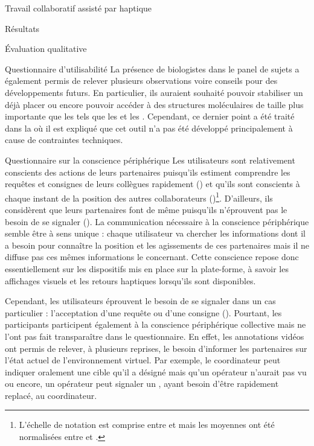 \documentclass[myfrancais,ngerman,english,frenchb]{mythesis}
\begin{document}
\begin{mychapter}{Travail collaboratif assisté par haptique}
\begin{mysection}{Résultats}
\begin{mysubsection}{Évaluation qualitative}
\begin{mysubsubsection}{Questionnaire d'utilisabilité}
					La présence de biologistes dans le panel de sujets a également permis de relever plusieurs observations voire conseils pour des développements futurs.
					En particulier, ils auraient souhaité pouvoir stabiliser un  déjà placer ou encore pouvoir accéder à des structures moléculaires de taille plus importante que les  tels que les \myhelice* et les \myfeuillet*.
					Cependant, ce dernier point a été traité dans la  où il est expliqué que cet outil n'a pas été développé principalement à cause de contraintes techniques.
				\end{mysubsubsection}
				\begin{mysubsubsection}{Questionnaire sur la conscience périphérique}
					Les utilisateurs sont relativement conscients des actions de leurs partenaires puisqu'ils estiment comprendre les requêtes et consignes de leurs collègues rapidement () et qu'ils sont conscients à chaque instant de la position des autres collaborateurs ()\footnote{L'échelle de notation est comprise entre  et  mais les moyennes ont été normalisées entre  et .}.
					D'ailleurs, ils considèrent que leurs partenaires font de même puisqu'ils n'éprouvent pas le besoin de se signaler ().
					La communication nécessaire à la conscience périphérique semble être à sens unique : chaque utilisateur va chercher les informations dont il a besoin pour connaître la position et les agissements de ces partenaires mais il ne diffuse pas ces mêmes informations le concernant.
					Cette conscience repose donc essentiellement sur les dispositifs mis en place sur la plate-forme, à savoir les affichages visuels et les retours haptiques lorsqu'ils sont disponibles.

					Cependant, les utilisateurs éprouvent le besoin de se signaler dans un cas particulier : l'acceptation d'une requête ou d'une consigne ().
					Pourtant, les participants participent également à la conscience périphérique collective mais ne l'ont pas fait transparaître dans le questionnaire.
					En effet, les annotations vidéos ont permis de relever, à plusieurs reprises, le besoin d'informer les partenaires sur l'état actuel de l'environnement virtuel.
					Par exemple, le coordinateur peut indiquer oralement une cible qu'il a désigné mais qu'un opérateur n'aurait pas vu ou encore, un opérateur peut signaler un , ayant besoin d'être rapidement replacé, au coordinateur.


\end{mysubsubsection}
\end{mysubsection}
\end{mysection}
\end{mychapter}
\end{document}
